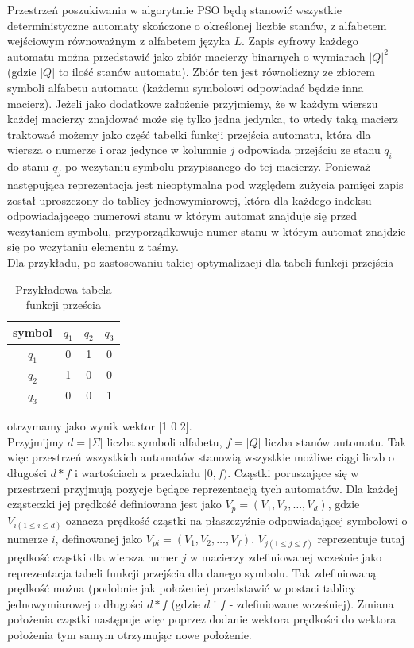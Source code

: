 \documentclass[runningheads,a4paper]{llncs}
\begin{document}
Przestrzeń poszukiwania w algorytmie PSO będą stanowić wszystkie deterministyczne automaty skończone o określonej liczbie stanów, z alfabetem wejściowym równoważnym z alfabetem języka $L$. Zapis cyfrowy każdego automatu można przedstawić jako zbiór macierzy binarnych o wymiarach $|Q|^2$ (gdzie $|Q|$ to ilość stanów automatu). Zbiór ten jest równoliczny ze zbiorem symboli alfabetu automatu (każdemu symbolowi odpowiadać będzie inna macierz). Jeżeli jako dodatkowe założenie przyjmiemy, że w każdym wierszu każdej macierzy znajdować może się tylko jedna jedynka, to wtedy taką macierz traktować możemy jako część tabelki funkcji przejścia automatu, która dla wiersza o numerze i oraz jedynce w kolumnie $j$ odpowiada przejściu ze stanu $q_{i}$ do stanu $q_{j}$ po wczytaniu symbolu przypisanego do tej macierzy. Ponieważ następująca reprezentacja jest nieoptymalna pod względem zużycia pamięci zapis został uproszczony do tablicy jednowymiarowej, która dla każdego indeksu odpowiadającego numerowi stanu w którym automat znajduje się przed wczytaniem symbolu, przyporządkowuje numer stanu w którym automat znajdzie się po wczytaniu elementu z taśmy.\\

Dla przykładu, po zastosowaniu takiej optymalizacji dla tabeli funkcji przejścia 
\begin{table}[]
\centering
\begin{tabular}{c|c|c|c|}
symbol                   & $q_{1}$ & $q_{2}$ & $q_{3}$ \\ \hline
\multicolumn{1}{c|}{$q_{1}$} & 0  & 1  & 0  \\ \hline
\multicolumn{1}{c|}{$q_{2}$} & 1  & 0  & 0  \\ \hline
\multicolumn{1}{c|}{$q_{3}$} & 0  & 0  & 1  \\ \hline
\end{tabular}
\vspace{0.5cm}
\caption{Przykładowa tabela funkcji prześcia}
\end{table}

otrzymamy jako wynik wektor [1 0 2].\\

Przyjmijmy $d = |\Sigma|$ liczba symboli alfabetu, $f = |Q|$ liczba stanów automatu. Tak więc przestrzeń wszystkich automatów stanowią wszystkie możliwe ciągi liczb o długości $d*f$ i wartościach z przedziału $[0, f)$. Cząstki poruszające się w przestrzeni przyjmują pozycje będące reprezentacją tych automatów. Dla każdej cząsteczki jej prędkość definiowana jest jako $V_{p} = (V_{1}, V_{2}, …, V_{d})$, gdzie $V_{i (1 \leq i \leq d)}$ oznacza prędkość cząstki na płaszczyźnie odpowiadającej symbolowi o numerze $i$, definowanej jako $V_{pi} = (V_{1}, V_{2}, …, V_{f})$. $V_{j (1 \leq j \leq f)}$ reprezentuje tutaj prędkość cząstki dla wiersza numer $j$ w macierzy zdefiniowanej wcześnie jako reprezentacja tabeli funkcji przejścia dla danego symbolu. Tak zdefiniowaną prędkość można (podobnie jak położenie) przedstawić w postaci tablicy jednowymiarowej o długości $d*f$ (gdzie $d$ i $f$ - zdefiniowane wcześniej). Zmiana położenia cząstki następuje więc poprzez dodanie wektora prędkości do wektora położenia tym samym otrzymując nowe położenie.
\end{document}
